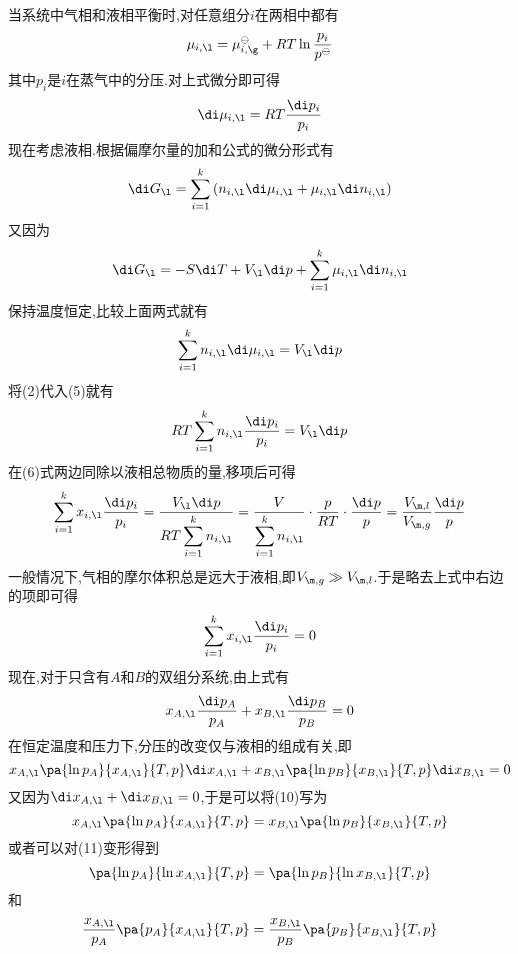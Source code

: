 \documentclass{ctexart}
\begin{document}
\begin{derivation}\setcounter{equation}{0}
    当系统中气相和液相平衡时,对任意组分$i$在两相中都有
    \begin{equation}\mu_{i,\l}=\mu_{i,\g}^\ominus+RT\ln\dfrac{p_i}{p^\ominus}\end{equation}
    其中$p_i$是$i$在蒸气中的分压.对上式微分即可得
    \begin{equation}\di\mu_{i,\l}=RT\dfrac{\di p_i}{p_i}\end{equation}
    现在考虑液相.根据偏摩尔量的加和公式的微分形式有
    \begin{equation}\di G_\l=\sum_{i=1}^k\left(n_{i,\l}\di\mu_{i,\l}+\mu_{i,\l}\di n_{i,\l}\right)\end{equation}
    又因为
    \begin{equation}\di G_\l=-S\di T+V_\l\di p+\sum_{i=1}^k\mu_{i,\l}\di n_{i,\l}\end{equation}
    保持温度恒定,比较上面两式就有
    \begin{equation}\sum_{i=1}^{k}n_{i,\l}\di\mu_{i,\l}=V_\l\di p\end{equation}
    将(2)代入(5)就有
    \begin{equation}RT\sum_{i=1}^kn_{i,\l}\dfrac{\di p_i}{p_i}={V_\l}\di p\end{equation}
    在(6)式两边同除以液相总物质的量,移项后可得
    \begin{equation}
        \sum_{i=1}^kx_{i,\l}\dfrac{\di p_i}{p_i}=\dfrac{V_\l\di p}{RT\displaystyle\sum_{i=1}^kn_{i,\l}}
        =\dfrac{V}{\displaystyle\sum_{i=1}^kn_{i,\l}}\cdot\dfrac{p}{RT}\cdot\dfrac{\di p}{p}
        =\dfrac{V_{\m,l}}{V_{\m,g}}\dfrac{\di p}{p}
    \end{equation}
    一般情况下,气相的摩尔体积总是远大于液相,即$V_{\m,g}\gg V_{\m,l}$.于是略去上式中右边的项即可得
    \begin{equation}\sum_{i=1}^kx_{i,\l}\dfrac{\di p_i}{p_i}=0\end{equation}
    现在,对于只含有$A$和$B$的双组分系统,由上式有
    \begin{equation}x_{A,\l}\dfrac{\di p_A}{p_A}+x_{B,\l}\dfrac{\di p_B}{p_B}=0\end{equation}
    在恒定温度和压力下,分压的改变仅与液相的组成有关,即
    \begin{equation}
        x_{A,\l}\pa{\ln p_A}{x_{A,\l}}{T,p}\di x_{A,\l}+x_{B,\l}\pa{\ln p_B}{x_{B,\l}}{T,p}\di x_{B,\l}=0
    \end{equation}
    又因为$\di x_{A,\l}+\di x_{B,\l}=0$,于是可以将(10)写为
    \begin{equation}
        x_{A,\l}\pa{\ln p_A}{x_{A,\l}}{T,p}=x_{B,\l}\pa{\ln p_B}{x_{B,\l}}{T,p}
    \end{equation}
    或者可以对(11)变形得到
    \begin{equation}
        \pa{\ln p_A}{\ln x_{A,\l}}{T,p}=\pa{\ln p_B}{\ln x_{B,\l}}{T,p}
    \end{equation}
    和
    \begin{equation}
        \dfrac{x_{A,\l}}{p_A}\pa{p_A}{x_{A,\l}}{T,p}=\dfrac{x_{B,\l}}{p_B}\pa{p_B}{x_{B,\l}}{T,p}
    \end{equation}

\end{derivation}
\end{document}
